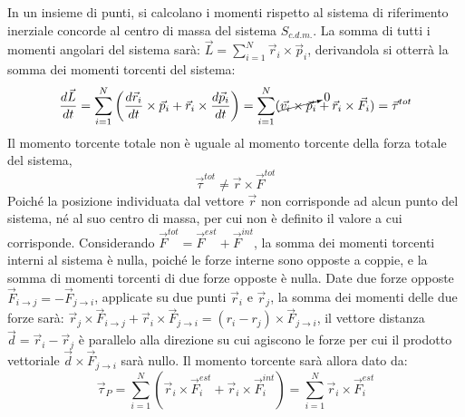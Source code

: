 \documentclass{article}
\numberwithin{equation}{subsection}
\begin{document}
In un insieme di punti, si calcolano i momenti rispetto 
al sistema di riferimento inerziale concorde al centro 
di massa del sistema $S_{c.d.m.}$. La somma 
di tutti i momenti angolari del sistema sarà: $\vec{L}=\displaystyle\sum_{i=1}^{N}\vec{r}_i\times\vec{p}_i$, 
derivandola si otterrà la somma dei momenti torcenti 
del sistema: 
\begin{equation}
    \displaystyle\frac{d\vec{L}}{dt}=\sum_{i=1}^{N}\left(\frac{d\vec{r}_i}{dt}\times\vec{p}_i+\vec{r}_i\times\frac{d\vec{p}_i}{dt}\right)=\sum_{i=1}^{N}(\cancelto{0}{\vec{v_i}\times\vec{p}_i}+\vec{r}_i\times\vec{F}_i)=\vec{\tau}^{tot}
\end{equation}
Il momento torcente totale non è uguale al momento torcente 
della forza totale del sistema, 
\begin{equation}
    \vec{\tau}^{tot}\neq\vec{r}\times\vec{F}^{tot}
\end{equation}
Poiché la posizione individuata dal vettore $\vec{r}$ non corrisponde ad alcun punto del sistema, né al suo centro di massa, per cui non è definito il valore a cui corrisponde. 
Considerando $\vec{F}^{tot}=\vec{F}^{est}+\vec{F}^{int}$, la 
somma dei momenti torcenti interni al sistema è nulla, poiché 
le forze interne sono opposte a coppie, e la somma di momenti 
torcenti di due forze opposte è nulla. Date due forze opposte 
$\vec{F}_{i\to j}=-\vec{F}_{j\to i}$, applicate su due punti 
$\vec{r}_i$ e $\vec{r}_j$, la somma dei momenti delle due forze 
sarà: $\vec{r}_j\times\vec{F}_{i\to j}+\vec{r}_i\times\vec{F}_{j\to i}=(r_i-r_j)\times\vec{F}_{j\to i}$, 
il vettore distanza $\vec{d}=\vec{r}_i-\vec{r}_j$ è parallelo 
alla direzione su cui agiscono le forze per cui il prodotto 
vettoriale $\vec{d}\times\vec{F}_{j\to i}$ sarà nullo. 
Il momento torcente sarà allora dato da:
\begin{equation}
    \vec{\tau}_P=\displaystyle\sum_{i=1}^{N}(\vec{r}_i\times\vec{F}^{est}_i+\vec{r}_i\times\vec{F}^{int}_i)=\sum_{i=1}^{N}\vec{r}_i\times\vec{F}^{est}_i
\end{equation}
\begin{center}\end{center}
\end{document}
